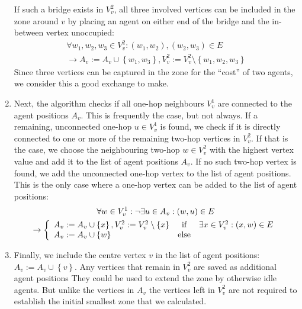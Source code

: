 \begin{enumerate}
        If such a bridge exists in $V_v^2$, all three involved vertices can be included in the zone around $v$ by placing an agent on either end of the bridge and the in-between vertex unoccupied:
        \begin{multline}
        \forall w_1, w_2, w_3 \in V_v^2: \left(w_1, w_2\right ), \left(w_2, w_3 \right ) \in E \\ \rightarrow A_v := A_v \cup \left\{w_1, w_3 \right \}, V_v^2 := V_v^2 \setminus \left\{w_1,w_2,w_3\right\}
        \end{multline}
        Since three vertices can be captured in the zone for the \enquote{cost} of two agents, we consider this a good exchange to make.
  \item Next, the algorithm checks if all one-hop neighbours $V_v^1$ are connected to the agent positions $A_v$.
        This is frequently the case, but not always.
        If a remaining, unconnected one-hop $u \in V_v^1$ is found, we check if it is directly connected to one or more of the remaining two-hop vertices in $V_v^2$.
        If that is the case, we choose the neighbouring two-hop $w \in V_v^2$ with the highest vertex value and add it to the list of agent positions $A_v$.
        If no such two-hop vertex is found, we add the unconnected one-hop vertex to the list of agent positions.
        This is the only case where a one-hop vertex can be added to the list of agent positions: \begin{multline}
        \forall w \in V_v^1: \lnot \exists u \in A_v: \left(w, u \right ) \in E \\\rightarrow \left\{\begin{array}{lcl}
A_v := A_v \cup \left\{x\right\}, V_v^2 := V_v^2 \setminus \left\{x\right\} & \textup{if} & \exists x \in V_v^2: \left(x, w \right ) \in E\\
A_v := A_v \cup \left\{w\right\} &\textup{else} &
\end{array}\right.
        \end{multline}
  \item Finally, we include the centre vertex $v$ in the list of agent positions: $A_v := A_v \cup \left\{v\right\}$.
        Any vertices that remain in $V_v^2$ are saved as additional agent positions
        They could be used to extend the zone by otherwise idle agents.
        But unlike the vertices in $A_v$ the vertices left in $V_{v}^{2}$ are not required to establish the initial smallest zone that we calculated.
\end{enumerate}
